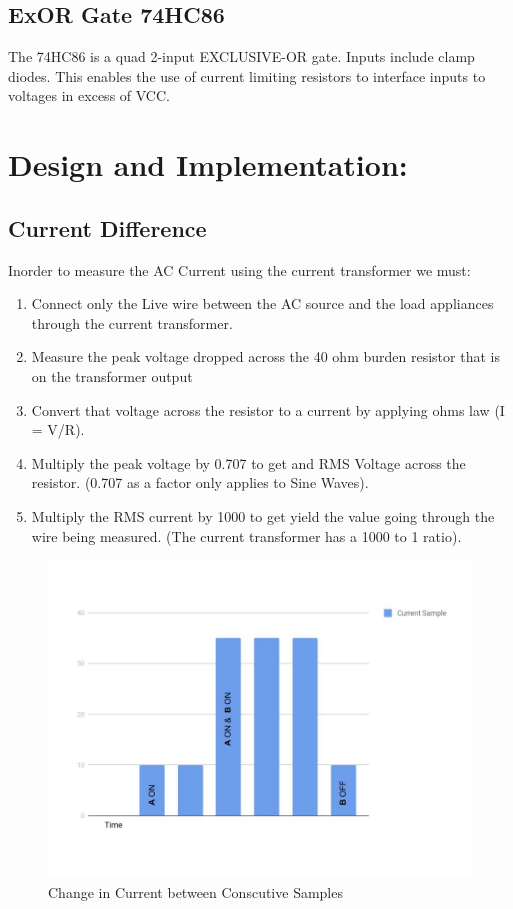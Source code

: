 \section{ExOR Gate 74HC86}
{
The 74HC86 is a quad 2-input EXCLUSIVE-OR gate. Inputs include clamp diodes. This enables the use of current limiting resistors to interface inputs to voltages in excess of VCC. 
}

\chapter{Design and Implementation:}

\section{Current Difference}
{
Inorder to measure the AC Current using the current transformer we must:

\begin{enumerate}
  \item Connect only the Live wire between the AC source and the load appliances through the current transformer.
  \item Measure the peak voltage dropped across the 40 ohm burden resistor that is on the transformer output
  \item Convert that voltage across the resistor to a current by applying ohms law (I = V/R).
  \item Multiply the peak voltage by 0.707 to get and RMS Voltage across the resistor.  (0.707 as a factor only applies to Sine Waves).
  \item Multiply the RMS current by 1000 to get yield the value going through the wire being measured.  (The current transformer has a 1000 to 1 ratio).
  
\end{enumerate}

\begin{figure}[H]
	    \includegraphics[scale=0.50]{images/cdiff.jpg}
	    \centering
	    \caption{Change in Current between Conscutive Samples}
	    \label{cdiff}
	\end{figure}
	

}
